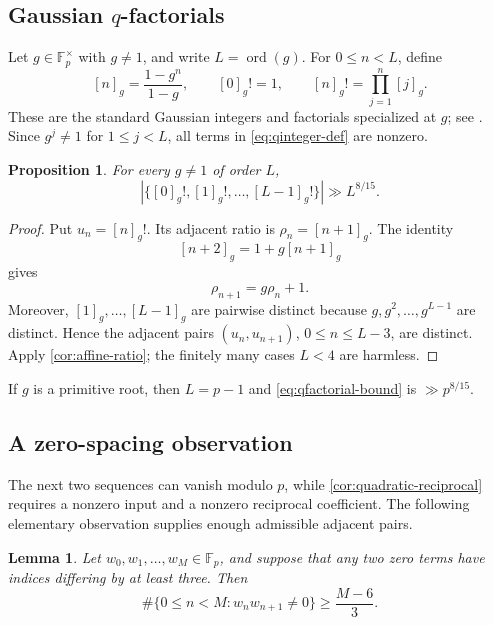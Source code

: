 \documentclass[11pt,reqno]{amsart}
\numberwithin{equation}{section}
\newtheorem{proposition}[proposition]{Proposition}
\newtheorem{lemma}[lemma]{Lemma}
\theoremstyle{definition}
\theoremstyle{remark}
\newcommand{\F}{\mathbb F}
\newcommand{\ord}{\operatorname{ord}}
\begin{document}
\subsection{Gaussian $q$-factorials}

Let $g\in\F_p^\times$ with $g\ne1$, and write $L=\ord(g)$.  For $0\le n<L$, define
\begin{equation}\label{eq:qinteger-def}
  [n]_g=\frac{1-g^n}{1-g},
  \qquad
  [0]_g!=1,
  \qquad
  [n]_g!=\prod_{j=1}^n[j]_g.
\end{equation}
These are the standard Gaussian integers and factorials specialized at $g$; see \cite{GasperRahman2004}.  Since $g^j\ne1$ for $1\le j<L$, all terms in \eqref{eq:qinteger-def} are nonzero.

\begin{proposition}\label{prop:qfactorial}
For every $g\ne1$ of order $L$,
\begin{equation}\label{eq:qfactorial-bound}
  \left|\{[0]_g!,[1]_g!,\ldots,[L-1]_g!\}\right|
  \gg L^{8/15}.
\end{equation}
\end{proposition}

\begin{proof}
Put $u_n=[n]_g!$.  Its adjacent ratio is $\rho_n=[n+1]_g$.  The identity
\[
  [n+2]_g=1+g[n+1]_g
\]
gives
\[
  \rho_{n+1}=g\rho_n+1.
\]
Moreover, $[1]_g,\ldots,[L-1]_g$ are pairwise distinct because $g,g^2,\ldots,g^{L-1}$ are distinct.  Hence the adjacent pairs $(u_n,u_{n+1})$, $0\le n\le L-3$, are distinct.  Apply \cref{cor:affine-ratio}; the finitely many cases $L<4$ are harmless.
\end{proof}

If $g$ is a primitive root, then $L=p-1$ and \eqref{eq:qfactorial-bound} is $\gg p^{8/15}$.

\subsection{A zero-spacing observation}

The next two sequences can vanish modulo $p$, while \cref{cor:quadratic-reciprocal} requires a nonzero input and a nonzero reciprocal coefficient.  The following elementary observation supplies enough admissible adjacent pairs.

\begin{lemma}\label{lem:zero-spacing}
Let $w_0,w_1,\ldots,w_M\in\F_p$, and suppose that any two zero terms have indices differing by at least three.  Then
\begin{equation}\label{eq:good-adjacent-pairs}
  \#\{0\le n<M:w_nw_{n+1}\ne0\}
  \ge\frac{M-6}{3}.
\end{equation}
\end{lemma}
\end{document}
